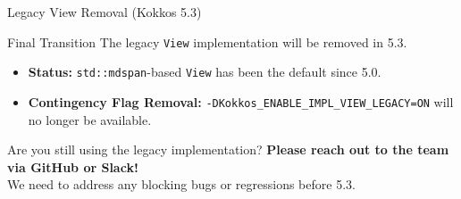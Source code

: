 
\begin{frame}[fragile]{Legacy View Removal (Kokkos 5.3)}

\begin{alertblock}{Final Transition}
The legacy \texttt{View} implementation will be removed in 5.3.
\end{alertblock}

\begin{itemize}
    \item \textbf{Status:} \texttt{std::mdspan}-based \texttt{View} has been the default since 5.0.
    \item \textbf{Contingency Flag Removal:} \texttt{-DKokkos\_ENABLE\_IMPL\_VIEW\_LEGACY=ON} will no longer be available.
\end{itemize}

\vfill

\begin{block}{Are you still using the legacy implementation?}
\centering
\textbf{Please reach out to the team via GitHub or Slack!} \\
We need to address any blocking bugs or regressions before 5.3.
\end{block}

\end{frame}





%



